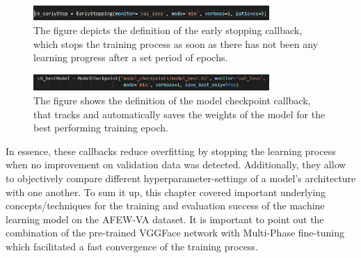 \begin{figure}[H]
  \begin{center}
  \includegraphics[angle=0, width=0.8\textwidth]{Figures/EarlyStopping.PNG}
  \caption[EarlyStopping callback]{The figure depicts the definition of the early stopping callback, which stops the training process as soon as there has not been any learning progress after a set period of epochs.}
  \label{fig:EarlyStopping}
  \end{center}
\end{figure}

\begin{figure}[H]
  \begin{center}
  \includegraphics[angle=0, width=0.8\textwidth]{Figures/ModelCheckpoint.PNG}
  \caption[Model checkpoint callback]{The figure shows the definition of the model checkpoint callback, that tracks and automatically saves the weights of the model for the best performing training epoch.}
  \label{fig:ModelCheckpoint}
  \end{center}
\end{figure}

\noindent In essence, these callbacks reduce overfitting by stopping the learning process when no improvement on validation data was detected. Additionally, they allow to objectively compare different hyperparameter-settings of a model's architecture with one another.
\newline\newline
To sum it up, this chapter covered important underlying concepts/techniques for the training and evaluation success of the machine learning model on the AFEW-VA dataset. It is important to point out the combination of the pre-trained VGGFace network with Multi-Phase fine-tuning which facilitated a fast convergence of the training process.